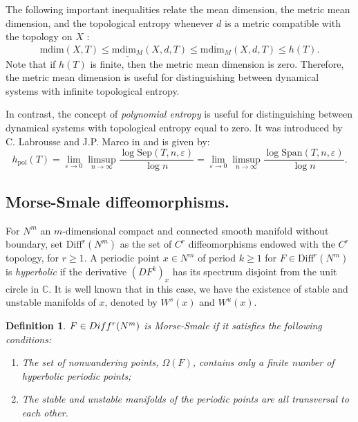 \documentclass[sn-mathphys-num]{sn-jnl}%
\theoremstyle{thmstyleone}%
\theoremstyle{thmstyletwo}%
\theoremstyle{thmstylethree}%
\newtheorem{definition}{Definition}%
\begin{document}
The following important inequalities relate the mean dimension, the metric mean dimension, and the topological entropy whenever $d$ is a metric compatible with the topology on $X$ \cite[Theorem 4.2]{lindenstrauss_weiss_2000}:
\begin{equation}\label{eq:mean-metric-mean-inequality}
    \text{mdim}(X, T) \leq \underline{\text{mdim}_M}(X, d, T) \leq \overline{\text{mdim}_M}(X, d, T) \leq h(T).
\end{equation}
Note that if $h(T)$ is finite, then the metric mean dimension is zero. Therefore, the metric mean dimension is useful for distinguishing between dynamical systems with infinite topological entropy.

In contrast, the concept of \emph{polynomial entropy} is useful for distinguishing between dynamical systems with topological entropy equal to zero. It was introduced by C. Labrousse and J.P. Marco in \cite{labrousse_marco_2014} and is given by:
\begin{equation}
    h_{\text{pol}}(T) = \lim\limits_{\varepsilon \to 0}\limsup\limits_{n \to \infty} \frac{\log \text{Sep}(T, n, \varepsilon)}{\log n} = \lim\limits_{\varepsilon \to 0}\limsup\limits_{n \to \infty} \frac{\log \text{Span}(T, n, \varepsilon)}{\log n}.
\end{equation}


\subsection{Morse-Smale diffeomorphisms.}\label{subsec:morse-smale-diffeos}

For $N^m$ an $m$-dimensional compact and connected smooth manifold without boundary, set $\text{Diff}^r(N^m)$ as the set of $C^r$ diffeomorphisms endowed with the $C^r$ topology, for $r \geq 1$. A periodic point $x \in N^m$ of period $k \geq 1$ for $F \in \text{Diff}^r(N^m)$ is \textit{hyperbolic} if the derivative $(DF^k)_x$ has its spectrum disjoint from the unit circle in $\mathbb{C}$. It is well known that in this case, we have the existence of stable and unstable manifolds of $x$, denoted by $W^s(x)$ and $W^u(x)$. \\

\begin{definition}
    $F \in \emph{Diff}^r(N^m)$ is \textit{Morse-Smale} if it satisfies the following conditions:
    \begin{enumerate}
        \item The set of nonwandering points, $\Omega(F)$, contains only a finite number of hyperbolic periodic points;
        \item The stable and unstable manifolds of the periodic points are all transversal to each other.
    \end{enumerate}
\end{definition}
\end{document}
